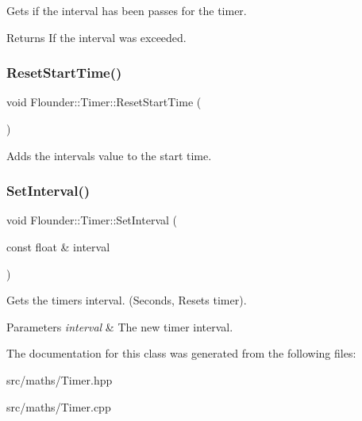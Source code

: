 Gets if the interval has been passes for the timer. 

\begin{DoxyReturn}{Returns}
If the interval was exceeded. 
\end{DoxyReturn}
\mbox{\label{class_flounder_1_1_timer_aad6123dfd293b81644d14f21ead665c7}} 
\subsubsection{\texorpdfstring{Reset\+Start\+Time()}{ResetStartTime()}}
{\footnotesize\ttfamily void Flounder\+::\+Timer\+::\+Reset\+Start\+Time (\begin{DoxyParamCaption}{ }\end{DoxyParamCaption})}



Adds the intervals value to the start time. 

\mbox{\label{class_flounder_1_1_timer_a31cbcf9de36dbb3b18634108f32ebb5d}} 
\subsubsection{\texorpdfstring{Set\+Interval()}{SetInterval()}}
{\footnotesize\ttfamily void Flounder\+::\+Timer\+::\+Set\+Interval (\begin{DoxyParamCaption}\item[{const float \&}]{interval }\end{DoxyParamCaption})}



Gets the timers interval. (Seconds, Resets timer). 


\begin{DoxyParams}{Parameters}
{\em interval} & The new timer interval. \\
\hline
\end{DoxyParams}


The documentation for this class was generated from the following files\+:\begin{DoxyCompactItemize}
\item 
src/maths/Timer.\+hpp\item 
src/maths/Timer.\+cpp\end{DoxyCompactItemize}
